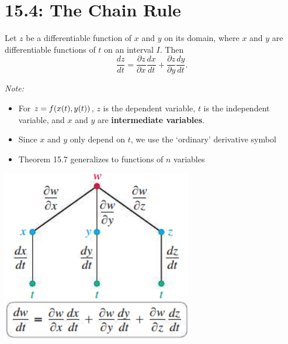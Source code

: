 \documentclass[../mathNotesPreamble]{subfiles}
\begin{document}
\section{15.4: The Chain Rule}

  \begin{thmBox*}
    Let $z$ be a differentiable function of $x$ and $y$ on its domain, where $x$ and $y$ are differentiable functions of $t$ on an interval $I$. Then
      \[\frac{dz}{dt}=\frac{\partial z}{\partial x}\frac{dx}{dt}+\frac{\partial z}{\partial y}\frac{dy}{dt}.\]
  \end{thmBox*}
  \vspace*{\baselineskip}

  \noindent
  \begin{minipage}{0.65\linewidth}
  \textit{Note:} 
    \begin{itemize}
      \item For $z=f{\left(x(t), y(t)\right)}$, $z$ is the dependent variable, $t$ is the independent variable, and $x$ and $y$ are \newline\textbf{intermediate variables}.
      \item Since $x$ and $y$ only depend on $t$, we use the `ordinary' derivative symbol
      \item Theorem 15.7 generalizes to functions of $n$ variables
    \end{itemize}
  \end{minipage}%
  \begin{minipage}{0.35\linewidth}
    \begin{flushright}
      \includegraphics[width=0.9\linewidth]{../images/briggs_15_04/fig15_37}
    \end{flushright}
  \end{minipage}
  \vspace*{\baselineskip}
\end{document}
